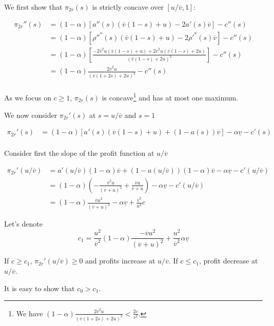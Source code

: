 \documentclass[a4paper,leqno]{article}%
\renewcommand{\a}{\alpha}
\newcommand{\uv}{\underline{v}}
\newcommand{\ov}{\overline{v}}
\begin{document}
We first show that $\pi_{2r}(s)$ is strictly concave over $[u/\ov,1]$:

\begin{equation}
    \begin{aligned}
\pi_{2r}''(s)&=(1-\a)[a''(s)(\ov(1-s)+u)-2a'(s)\ov]-c''(s)\\
            &= (1-\a)[\rho''^{*}(s)(\ov(1-s)+u)-2\rho'^{*}(s)\ov]-c''(s)\\
            &= (1-\a)[\frac{-2\ov^2u(\ov(1-s)+u)+2\ov^2u(\ov(1-s)+2u)}{(\ov(1-s)+2u)^3}]-c''(s)\\
            &= (1-\a)\frac{2\ov^2u}{(\ov(1+2s)+2u)^3}-c''(s)\\
    \end{aligned}
\end{equation}




As we focus on $c\geq 1$, $\pi_{2r}(s)$ is concave\footnote{We have $(1-\a)\frac{2\ov^2u}{(\ov(1+2s)+2u)^3}<\frac{2c}{s^2}$.} and has at most one maximum.


We now consider $\pi_{2r}'(s)$ at $s=u/\ov$ and $s=1$

\begin{equation}
    \begin{aligned}
\pi_{2r}'(s)&=(1-\a)[a'(s)(\ov(1-s)+u)+(1-a(s))\ov]-\a\uv-c'(s)\\
\end{aligned}
\end{equation}

Consider first the slope of the profit function at $u/\ov$

\begin{equation}
    \begin{aligned}
\pi_{2r}'(u/\ov)&=a'(u/\ov)(1-\a)\ov+(1-a(u/\ov))(1-\a)\ov -\a\uv-c'(u/\ov)\\
                &=(1-\a)(-\frac{\ov^2 u}{(\ov+u)^2}+\frac{\ov u}{\ov+u}) -\a\uv-c'(u/\ov)\\
                &=(1-\a)\frac{\ov u^2}{(\ov+u)^2}-\a\uv+\frac{\ov^2}{u^2}c
\end{aligned}
\end{equation}

Let's denote $$c_1=\frac{u^2}{\ov^2}(1-\a)\frac{-\ov u^2}{(\ov+u)^2}+\frac{u^2}{\ov^2}\a\uv$$

If $c\geq c_1$,  $\pi_{2r}'(u/\ov)\geq 0$ and profits increase at $u/\ov$. If $c\leq c_1$, profit decrease at $u/\ov$.

It is easy to show that $c_0>c_1$.
\end{document}
